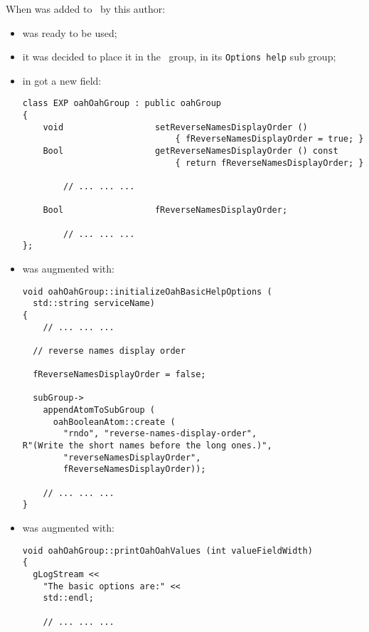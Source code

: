 When  was added to \oahRepr\ by this author:
\begin{itemize}

\item {} was ready to be used;

\item it was decided to place it in the  \oahRepr\ group, in its {\tt Options~help} sub group;

\item {} in  got a new  field:
\begin{lstlisting}[language=CPlusPlus]
class EXP oahOahGroup : public oahGroup
{
    void                  setReverseNamesDisplayOrder ()
                              { fReverseNamesDisplayOrder = true; }
    Bool                  getReverseNamesDisplayOrder () const
                              { return fReverseNamesDisplayOrder; }

		// ... ... ...

    Bool                  fReverseNamesDisplayOrder;

		// ... ... ...
};
\end{lstlisting}

\item {} was augmented with:
\begin{lstlisting}[language=CPlusPlus]
void oahOahGroup::initializeOahBasicHelpOptions (
  std::string serviceName)
{
	// ... ... ...

  // reverse names display order

  fReverseNamesDisplayOrder = false;

  subGroup->
    appendAtomToSubGroup (
      oahBooleanAtom::create (
        "rndo", "reverse-names-display-order",
R"(Write the short names before the long ones.)",
        "reverseNamesDisplayOrder",
        fReverseNamesDisplayOrder));

	// ... ... ...
}
\end{lstlisting}

\item {} was augmented with:
\begin{lstlisting}[language=CPlusPlus]
void oahOahGroup::printOahOahValues (int valueFieldWidth)
{
  gLogStream <<
    "The basic options are:" <<
    std::endl;

	// ... ... ...


\end{lstlisting}
\end{itemize}
